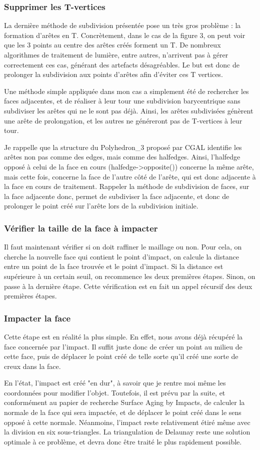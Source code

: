 \documentclass[a4paper,french]{report}
\begin{document}
				\subsubsection{Supprimer les T-vertices}
					La dernière méthode de subdivision présentée pose un très gros problème : la formation d'arêtes en T. Concrètement, dans le cas de la figure 3, on peut voir que les 3 points au centre des arêtes créés forment un T. De nombreux algorithmes de traitement de lumière, entre autres, n'arrivent pas à gérer correctement ces cas, générant des artefacts désagréables. Le but est donc de prolonger la subdivision aux points d'arêtes afin d'éviter ces T vertices. \par 
					Une méthode simple appliquée dans mon cas a simplement été de rechercher les faces adjacentes, et de réaliser à leur tour une subdivision barycentrique sans subdiviser les arêtes qui ne le sont pas déjà. Ainsi, les arêtes subdivisées génèrent une arête de prolongation, et les autres ne généreront pas de T-vertices à leur tour. \par 
					Je rappelle que la structure du Polyhedron\_3 proposé par CGAL identifie les arêtes non pas comme des edges, mais comme des halfedges. Ainsi, l'halfedge opposé à celui de la face en cours (halfedge-\textgreater opposite()) concerne la même arête, mais cette fois, concerne la face de l'autre côté de l'arête, qui est donc adjacente à la face en cours de traitement. Rappeler la méthode de subdivision de faces, sur la face adjacente donc, permet de subdiviser la face adjacente, et donc de prolonger le point créé sur l'arête lors de la subdivision initiale.
				\subsubsection{Vérifier la taille de la face à impacter}
					Il faut maintenant vérifier si on doit raffiner le maillage ou non. Pour cela, on cherche la nouvelle face qui contient le point d'impact, on calcule la distance entre un point de la face trouvée et le point d'impact. Si la distance est supérieure à un certain seuil, on recommence les deux premières étapes. Sinon, on passe à la dernière étape. Cette vérification est en fait un appel récursif des deux premières étapes.
				\subsubsection{Impacter la face}
					Cette étape est en réalité la plus simple. En effet, nous avons déjà récupéré la face concernée par l'impact. Il suffit juste donc de créer un point au milieu de cette face, puis de déplacer le point créé de telle sorte qu'il créé une sorte de creux dans la face. \par
					En l'état, l'impact est créé "en dur", à savoir que je rentre moi même les coordonnées pour modifier l'objet. Toutefois, il est prévu par la suite, et conformément au papier de recherche Surface Aging by Impacts, de calculer la normale de la face qui sera impactée, et de déplacer le point créé dans le sens opposé à cette normale.
					Néanmoins, l'impact reste relativement étiré même avec la division en six sous-triangles. La triangulation de Delaunay reste une solution optimale à ce problème, et devra donc être traité le plus rapidement possible.
\end{document}
